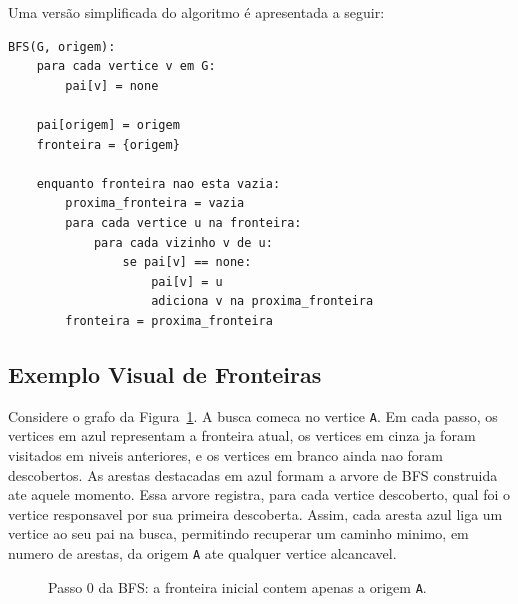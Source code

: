 \documentclass{article}
\begin{document}
Uma versão simplificada do algoritmo é apresentada a seguir:

\begin{lstlisting}
BFS(G, origem):
    para cada vertice v em G:
        pai[v] = none

    pai[origem] = origem
    fronteira = {origem}

    enquanto fronteira nao esta vazia:
        proxima_fronteira = vazia
        para cada vertice u na fronteira:
            para cada vizinho v de u:
                se pai[v] == none:
                    pai[v] = u
                    adiciona v na proxima_fronteira
        fronteira = proxima_fronteira
\end{lstlisting}

\subsection{Exemplo Visual de Fronteiras}

Considere o grafo da Figura~\ref{fig:bfs-step0}. A busca comeca no vertice
\texttt{A}. Em cada passo, os vertices em azul representam a fronteira atual,
os vertices em cinza ja foram visitados em niveis anteriores, e os vertices em
branco ainda nao foram descobertos. As arestas destacadas em azul formam a
arvore de BFS construida ate aquele momento. Essa arvore registra, para cada
vertice descoberto, qual foi o vertice responsavel por sua primeira descoberta.
Assim, cada aresta azul liga um vertice ao seu pai na busca, permitindo recuperar
um caminho minimo, em numero de arestas, da origem \texttt{A} ate qualquer
vertice alcancavel.

\begin{figure}[H]
\centering
{}
\caption{Passo 0 da BFS: a fronteira inicial contem apenas a origem \texttt{A}.}
\label{fig:bfs-step0}
\end{figure}
\end{document}
